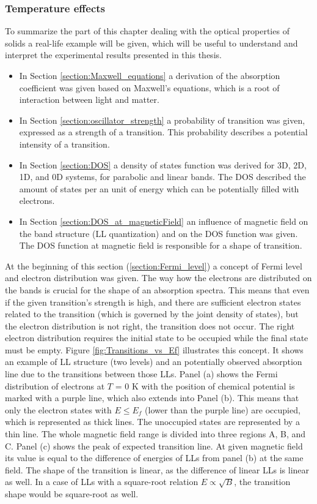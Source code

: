 \documentclass[titlepage,a4paper]{book}
\newcommand{\wciecie}{\quad\phantom{v}}
\begin{document}
\subsubsection{Temperature effects}
\wciecie
To summarize the part of this chapter dealing with the optical properties of solids a real-life example will be given, which will be useful to understand and interpret the experimental results presented in this thesis.
\begin{itemize}
\item In Section \ref{section:Maxwell_equations} a derivation of the absorption coefficient was given based on Maxwell's equations, which is a root of interaction between light and matter.
\item In Section \ref{section:oscillator_strength} a probability of transition was given, expressed as a strength of a transition. This probability describes a potential intensity of a transition.
\item In Section \ref{section:DOS} a density of states function was derived for 3D, 2D, 1D, and 0D systems, for parabolic and linear bands. The DOS described the amount of states per an unit of energy which can be potentially filled with electrons.
\item In Section \ref{section:DOS_at_magneticField} an influence of magnetic field on the band structure (LL quantization) and on the DOS function was given. The DOS function at magnetic field is responsible for a shape of transition.
\end{itemize}
At the beginning of this section (\ref{section:Fermi_level}) a concept of Fermi level and electron distribution was given. The way how the electrons are distributed on the bands is crucial for the shape of an absorption spectra. This means that even if the given transition's strength is high, and there are sufficient electron states related to the transition (which is governed by the joint density of states), but the electron distribution is not right, the transition does not occur. The right electron distribution requires the initial state to be occupied while the final state must be empty. Figure \ref{fig:Transitions_vs_Ef} illustrates this concept. It shows an example of LL structure (two levels) and an potentially observed absorption line due to the transitions between those LLs. Panel (a) shows the Fermi distribution of electrons at $T$ = 0 K with the position of chemical potential is marked with a purple line, which also extends into Panel (b). This means that only the electron states with $E \leq E_f$ (lower than the purple line) are occupied, which is represented as thick lines. The unoccupied states are represented by a thin line. The whole magnetic field range is divided into three regions A, B, and C. Panel (c) shows the peak of expected transition line. At given magnetic field its value is equal to the difference of energies of LLs from panel (b) at the same field. The shape of the transition is linear, as the difference of linear LLs is linear as well. In a case of LLs with a square-root relation $E \propto \sqrt{B}$, the transition shape would be square-root as well. 
\end{document}
